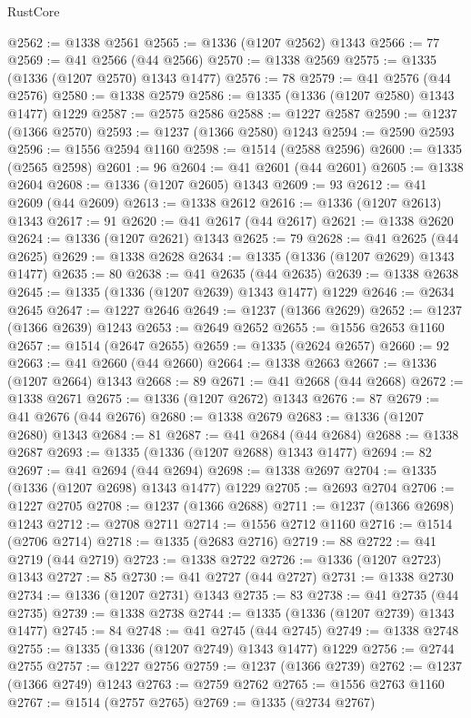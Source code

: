 \begin{lexlean}{RustCore}
\begin{coremodule}
@2562 := @1338 @2561
@2565 := @1336 (@1207 @2562) @1343
@2566 := 77
@2569 := @41 @2566 (@44 @2566)
@2570 := @1338 @2569
@2575 := @1335 (@1336 (@1207 @2570) @1343 @1477)
@2576 := 78
@2579 := @41 @2576 (@44 @2576)
@2580 := @1338 @2579
@2586 := @1335 (@1336 (@1207 @2580) @1343 @1477) @1229
@2587 := @2575 @2586
@2588 := @1227 @2587
@2590 := @1237 (@1366 @2570)
@2593 := @1237 (@1366 @2580) @1243
@2594 := @2590 @2593
@2596 := @1556 @2594 @1160
@2598 := @1514 (@2588 @2596)
@2600 := @1335 (@2565 @2598)
@2601 := 96
@2604 := @41 @2601 (@44 @2601)
@2605 := @1338 @2604
@2608 := @1336 (@1207 @2605) @1343
@2609 := 93
@2612 := @41 @2609 (@44 @2609)
@2613 := @1338 @2612
@2616 := @1336 (@1207 @2613) @1343
@2617 := 91
@2620 := @41 @2617 (@44 @2617)
@2621 := @1338 @2620
@2624 := @1336 (@1207 @2621) @1343
@2625 := 79
@2628 := @41 @2625 (@44 @2625)
@2629 := @1338 @2628
@2634 := @1335 (@1336 (@1207 @2629) @1343 @1477)
@2635 := 80
@2638 := @41 @2635 (@44 @2635)
@2639 := @1338 @2638
@2645 := @1335 (@1336 (@1207 @2639) @1343 @1477) @1229
@2646 := @2634 @2645
@2647 := @1227 @2646
@2649 := @1237 (@1366 @2629)
@2652 := @1237 (@1366 @2639) @1243
@2653 := @2649 @2652
@2655 := @1556 @2653 @1160
@2657 := @1514 (@2647 @2655)
@2659 := @1335 (@2624 @2657)
@2660 := 92
@2663 := @41 @2660 (@44 @2660)
@2664 := @1338 @2663
@2667 := @1336 (@1207 @2664) @1343
@2668 := 89
@2671 := @41 @2668 (@44 @2668)
@2672 := @1338 @2671
@2675 := @1336 (@1207 @2672) @1343
@2676 := 87
@2679 := @41 @2676 (@44 @2676)
@2680 := @1338 @2679
@2683 := @1336 (@1207 @2680) @1343
@2684 := 81
@2687 := @41 @2684 (@44 @2684)
@2688 := @1338 @2687
@2693 := @1335 (@1336 (@1207 @2688) @1343 @1477)
@2694 := 82
@2697 := @41 @2694 (@44 @2694)
@2698 := @1338 @2697
@2704 := @1335 (@1336 (@1207 @2698) @1343 @1477) @1229
@2705 := @2693 @2704
@2706 := @1227 @2705
@2708 := @1237 (@1366 @2688)
@2711 := @1237 (@1366 @2698) @1243
@2712 := @2708 @2711
@2714 := @1556 @2712 @1160
@2716 := @1514 (@2706 @2714)
@2718 := @1335 (@2683 @2716)
@2719 := 88
@2722 := @41 @2719 (@44 @2719)
@2723 := @1338 @2722
@2726 := @1336 (@1207 @2723) @1343
@2727 := 85
@2730 := @41 @2727 (@44 @2727)
@2731 := @1338 @2730
@2734 := @1336 (@1207 @2731) @1343
@2735 := 83
@2738 := @41 @2735 (@44 @2735)
@2739 := @1338 @2738
@2744 := @1335 (@1336 (@1207 @2739) @1343 @1477)
@2745 := 84
@2748 := @41 @2745 (@44 @2745)
@2749 := @1338 @2748
@2755 := @1335 (@1336 (@1207 @2749) @1343 @1477) @1229
@2756 := @2744 @2755
@2757 := @1227 @2756
@2759 := @1237 (@1366 @2739)
@2762 := @1237 (@1366 @2749) @1243
@2763 := @2759 @2762
@2765 := @1556 @2763 @1160
@2767 := @1514 (@2757 @2765)
@2769 := @1335 (@2734 @2767)

\end{coremodule}
\end{lexlean}

